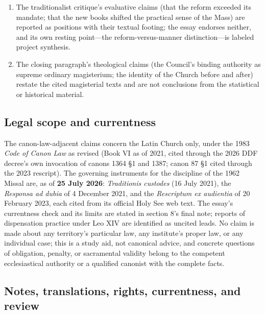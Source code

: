 \begin{enumerate}[leftmargin=1.45em,itemsep=0.25em]
\item The traditionalist critique's evaluative claims (that the reform exceeded its mandate; that the new books shifted the practical sense of the Mass) are reported as positions with their textual footing; the essay endorses neither, and its own resting point---the reform-versus-manner distinction---is labeled project synthesis.
\item The closing paragraph's theological claims (the Council's binding authority as supreme ordinary magisterium; the identity of the Church before and after) restate the cited magisterial texts and are not conclusions from the statistical or historical material.
\end{enumerate}

\subsection{Legal scope and currentness}

The canon-law-adjacent claims concern the Latin Church only, under the 1983 \emph{Code of Canon Law} as revised (Book VI as of 2021, cited through the 2026 DDF decree's own invocation of canons 1364 \S1 and 1387; canon 87 \S1 cited through the 2023 rescript). The governing instruments for the discipline of the 1962 Missal are, as of \textbf{25 July 2026}: \emph{Traditionis custodes} (16 July 2021), the \emph{Responsa ad dubia} of 4 December 2021, and the \emph{Rescriptum ex audientia} of 20 February 2023, each cited from its official Holy See web text. The essay's currentness check and its limits are stated in section 8's final note; reports of dispensation practice under Leo XIV are identified as uncited leads. No claim is made about any territory's particular law, any institute's proper law, or any individual case; this is a study aid, not canonical advice, and concrete questions of obligation, penalty, or sacramental validity belong to the competent ecclesiastical authority or a qualified canonist with the complete facts.

\subsection{Notes, translations, rights, currentness, and review}

